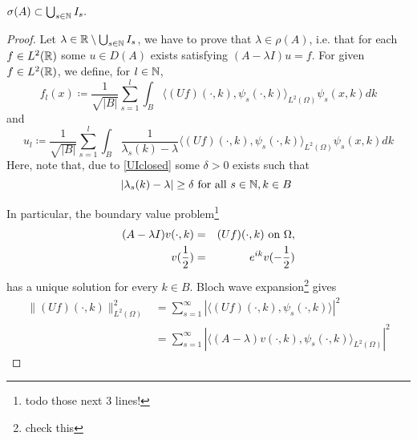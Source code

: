 	
\begin{theorem}
	$\sigma(A) \subset \bigcup_{s \in \mathbb{N}} I_{s}.$

	\begin{proof}
		Let $\lambda \in \mathbb{R} \setminus \bigcup_{s \in \mathbb{N}} I_{s}$, we have to prove that $\lambda \in \rho(A)$, i.e. that for each $f \in L^{2}(\mathbb{R})$ some $u \in D(A)$ exists satisfying $(A-\lambda I)u = f$. For given $f \in L^{2}(\mathbb{R})$, we define, for $l \in \mathbb{N}$, 
			\[ f_{l}(x) \coloneqq \frac{1}{\sqrt{|B|}} \sum_{s=1}^{l} \int_{B} \langle (Uf)(\cdot, k), \psi_{s}(\cdot, k)\rangle_{L^{2}(\Omega)} \psi_{s}(x,k) dk \]
			and
			\begin{equation}
				u_{l} \coloneqq \frac{1}{\sqrt{|B|}} \sum_{s=1}^{l} \int_{B} \frac{1}{\lambda_{s}(k) - \lambda} \langle (Uf)(\cdot, k), \psi_{s}(\cdot, k)\rangle_{L^{2}(\Omega)} \psi_{s}(x, k) dk \label{ul}
			\end{equation} 
		Here, note that, due to \eqref{UIclosed} some $\delta > 0$ exists such that
			\begin{equation}
				|\lambda_{s}(k) - \lambda| \geq \delta \text{ for all } s \in \N, k \in B \label{lambda-distance}
			\end{equation}

		In particular, the boundary value problem\footnote{todo those next 3 lines!} %
		\begin{eqnarray}
			(A - \lambda I) v(\cdot, k) & = & (Uf)(\cdot, k) \text{ on } \Omega, \label{3.33} \\
			v(\frac{1}{2}) & = & e^{ik} v(-\frac{1}{2}) \notag
		\end{eqnarray}
		has a unique solution for every $k \in B$. Bloch wave expansion\footnote{check this} gives %
		\begin{align*}
			\| (Uf)(\cdot, k)\|^{2}_{L^{2}(\Omega)} & = \sum_{s=1}^{\infty} |\langle (Uf)(\cdot, k), \psi_{s}(\cdot, k)\rangle|^{2} \\
			& = \sum_{s=1}^{\infty}|\langle (A - \lambda) v(\cdot, k), \psi_{s}(\cdot, k)\rangle_{L^{2}(\Omega)}|^{2}
		\end{align*}


\end{proof}
\end{theorem}
